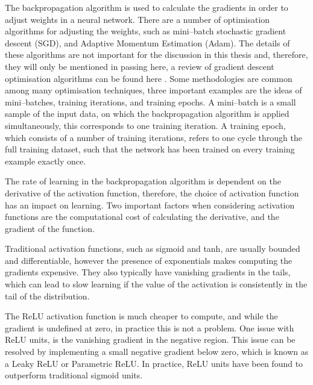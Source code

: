 The backpropagation algorithm is used to calculate the gradients in order to
adjust weights in a neural network. There are a number of optimisation 
algorithms for adjusting the weights, such as mini--batch stochastic gradient 
descent (SGD)\cite{10.1145/2623330.2623612}, and Adaptive Momentum Estimation 
(Adam)\cite{KingmaD.P.2015AAMf}. The details of these algorithms are not 
important for the discussion in this thesis and, therefore, they will only be 
mentioned in passing here, a review of gradient descent optimisation 
algorithms can be found here \cite{ruder2016overview}. Some methodologies are
common among many optimisation techniques, three important examples are the 
ideas of mini--batches, training iterations, and training epochs. A mini--batch
is a small sample of the input data, on which the backpropagation algorithm is
applied simultaneously, this corresponds to one training iteration. A training
epoch, which consists of a number of training iterations, refers to one cycle
through the full training dataset, such that the network has been trained on 
every training example exactly once.

\bigskip
\noindent
The rate of learning in the backpropagation algorithm is dependent on the
derivative of the activation function, therefore, the choice of activation
function has an impact on learning. Two important factors when considering
activation functions are the computational cost of calculating the derivative,
and the gradient of the function. 

Traditional activation functions, such as sigmoid and tanh, are usually 
bounded and differentiable, however the presence of exponentials makes 
computing the gradients expensive. They also typically have vanishing 
gradients in the tails, which can lead to slow learning if the value of the 
activation is consistently in the tail of the distribution. 

The ReLU activation function is much cheaper to compute, and while the 
gradient is undefined at zero, in practice this is not a problem. One issue 
with ReLU units, is the vanishing gradient in the negative region. This issue 
can be resolved by implementing a small negative gradient below zero, which is 
known as a Leaky ReLU or Parametric ReLU\cite{He2015}. In practice, ReLU 
units have been found to outperform traditional sigmoid 
units\cite{Maas13rectifiernonlinearities, 10.5555/3104322.3104425}.

